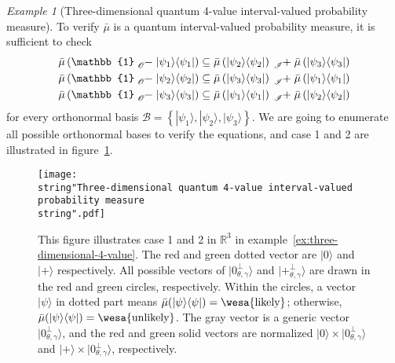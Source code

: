 \documentclass{article}
\theoremstyle{remark}
\newtheorem{example}{Example}
\newcommand{\ket}[1]{|#1\rangle}
\newcommand{\proj}[1]{|#1 \rangle\langle #1 |}
\newcommand{\ps}{\texttt{+}}
\newcommand{\likely}{{\mbox{\wesa{likely}}}}
\newcommand{\unlikely}{{\mbox{\wesa{unlikely}}}}
\begin{document}
\begin{example}[Three-dimensional quantum 4-value interval-valued
probability measure]
To verify $\bar{\mu}$ is a quantum interval-valued probability measure,
it is sufficient to check
\begin{equation}
\begin{aligned}\bar{\mu}\left(\mathbb{1}\tensor*[_{\mathscr{O}}]{-}{}\proj{\psi_{1}}\right) & \subseteq\bar{\mu}\left(\proj{\psi_{2}}\right)\tensor*[_{\mathscr{I}}]{+}{}\bar{\mu}\left(\proj{\psi_{3}}\right)\\
\bar{\mu}\left(\mathbb{1}\tensor*[_{\mathscr{O}}]{-}{}\proj{\psi_{2}}\right) & \subseteq\bar{\mu}\left(\proj{\psi_{3}}\right)\tensor*[_{\mathscr{I}}]{+}{}\bar{\mu}\left(\proj{\psi_{1}}\right)\\
\bar{\mu}\left(\mathbb{1}\tensor*[_{\mathscr{O}}]{-}{}\proj{\psi_{3}}\right) & \subseteq\bar{\mu}\left(\proj{\psi_{1}}\right)\tensor*[_{\mathscr{I}}]{+}{}\bar{\mu}\left(\proj{\psi_{2}}\right)
\end{aligned}
\label{eq:non-additive-vectors}
\end{equation}
 for every orthonormal basis $\mathcal{B}=\left\{ \ket{\psi_{1}},\ket{\psi_{2}},\ket{\psi_{3}}\right\} $.
We are going to enumerate all possible orthonormal bases to verify
the equations, and case 1 and 2 are illustrated in figure~\ref{fig:three-dimensional-4-value}.
\begin{figure}
\texttt{[image: \\string"Three-dimensional quantum 4-value interval-valued probability measure\\string".pdf]}\caption{\label{fig:three-dimensional-4-value}This figure illustrates case
1 and 2 in $\mathbb{R}^{3}$ in example~\ref{ex:three-dimensional-4-value}.
The red and green dotted vector are $\ket{0}$ and $\ket{\ps}$ respectively.
All possible vectors of $\ket{0_{\theta,\gamma}^{\perp}}$ and $\ket{\ps_{\theta,\gamma}^{\perp}}$
are drawn in the red and green circles, respectively. Within the circles,
a vector~$\ket{\psi}$ in dotted part means $\bar{\mu}(\proj{\psi})=\likely$;
otherwise, $\bar{\mu}(\proj{\psi})=\unlikely$. The gray vector is
a generic vector~$\ket{0_{\theta,\gamma}^{\perp}}$, and the red
and green solid vectors are normalized $\ket{0}\times\ket{0_{\theta,\gamma}^{\perp}}$
and $\ket{\ps}\times\ket{0_{\theta,\gamma}^{\perp}}$, respectively.}
\end{figure}


\end{example}
\end{document}
